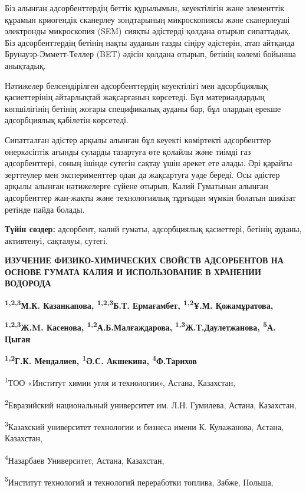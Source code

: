 Біз алынған адсорбенттердің беттік құрылымын, кеуектілігін және
элементтік құрамын криогендік сканерлеу зондтарының микроскопиясы және
сканерлеуші электронды микроскопия (SEM) сияқты әдістерді қолдана отырып
сипаттадық. Біз адсорбенттердің бетінің нақты ауданын газды сіңіру
әдістерін, атап айтқанда Брунауэр-Эмметт-Теллер (BET) әдісін қолдана
отырып, бетінің көлемі бойынша анықтадық.

Нәтижелер белсендірілген адсорбенттердің кеуектілігі мен адсорбциялық
қасиеттерінің айтарлықтай жақсарғанын көрсетеді. Бұл материалдардың
көпшілігінің бетінің жоғары спецификалық ауданы бар, бұл олардың ерекше
адсорбциялық қабілетін көрсетеді.

Сипатталған әдістер арқылы алынған бұл кеуекті көміртекті адсорбенттер
өнеркәсіптік ағынды суларды тазартуға өте қолайлы және тиімді газ
адсорбенттері, соның ішінде сутегін сақтау үшін әрекет ете алады. Әрі
қарайғы зерттеулер мен эксперименттер одан да жақсартуға уәде береді.
Осы әдістер арқылы алынған нәтижелерге сүйене отырып, Калий Гуматынан
алынған адсорбенттер жан-жақты және технологиялық тұрғыдан мүмкін
болатын шикізат ретінде пайда болады.

{\bfseries Түйін сөздер:} адсорбент, калий гуматы, адсорбциялық қасиеттері,
бетінің ауданы, активтенуі, сақталуы, сутегі.

{\bfseries ИЗУЧЕНИЕ ФИЗИКО-ХИМИЧЕСКИХ СВОЙСТВ АДСОРБЕНТОВ НА ОСНОВЕ ГУМАТА
КАЛИЯ И ИСПОЛЬЗОВАНИЕ В ХРАНЕНИИ ВОДОРОДА}

{\bfseries \textsuperscript{1,2,3}М.К. Казанкапова\textsuperscript{\envelope },
\textsuperscript{1,2,3}Б.Т. Ермағамбет, \textsuperscript{1,2}Ұ.М.
Қожамұратова,}

{\bfseries \textsuperscript{1,2,3}Ж.M. Касенова,
\textsuperscript{1,2}А.Б.Малғаждарова,}
{\bfseries \textsuperscript{1,3}Ж.Т.Даулетжанова, \textsuperscript{5}А.
Цыган}

{\bfseries \textsuperscript{1,2}Г.К. Мендалиев, \textsuperscript{1}Ә.С.
Акшекина, \textsuperscript{4}Ф.Тарихов}

\textsuperscript{1}ТОО «Институт химии угля и технологии», Астана,
Казахстан,

\textsuperscript{2}Евразийский национальный университет им. Л.Н.
Гумилева, Астана, Казахстан,

\textsuperscript{3}Казахский университет технологии и бизнеса имени К.
Кулажанова, Астана, Казахстан,

\textsuperscript{4}Назарбаев Университет, Астана, Казахстан,

\textsuperscript{5}Институт технологий и технологий переработки топлива,
Забже, Польша,

